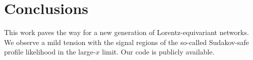 \section{Conclusions}\label{sec:conclusions}

This work paves the way for a new generation of Lorentz-equivariant
networks. We observe a mild tension with the signal regions of the
so-called Sudakov-safe profile likelihood in the large-$x$ limit. Our
code is publicly available.

